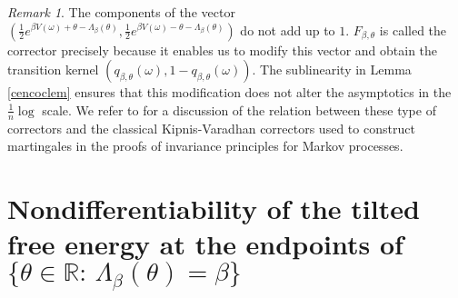 \documentclass[a4paper]{amsart}
\numberwithin{equation}{section}
\theoremstyle{plain}
\theoremstyle{remark}
\newtheorem{remark}[theorem]{\sc Remark}
\begin{document}
\begin{remark}\label{correctorname}
	The components of the vector $\left(\frac1{2}e^{\beta V(\omega) + \theta - \Lambda_\beta(\theta)}, \frac1{2}e^{\beta V(\omega) - \theta - \Lambda_\beta(\theta)}\right)$ do not add up to $1$.
	$F_{\beta,\theta}$ is called the corrector precisely because it enables us to modify this vector and obtain the transition kernel $(q_{\beta,\theta}(\omega),1-q_{\beta,\theta}(\omega))$. The sublinearity in Lemma \ref{cencoclem} 
	ensures that this modification does not alter the
	asymptotics in the $\frac1{n}\log$ scale. 
{}{We refer to  \cite[Section 2, Remark 2]{BerMukOka_preprint} for a 
discussion of the relation between these type of correctors and the classical Kipnis-Varadhan correctors used to construct martingales in the proofs
of invariance principles for Markov processes.}
\end{remark}

\section{Nondifferentiability of the tilted free energy at the endpoints of $\{\theta\in\mathbb{R}:\,\Lambda_\beta(\theta) = \beta\}$}\label{app_isimyok}
\end{document}
